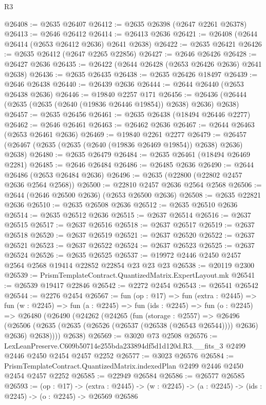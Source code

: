 \begin{lexlean}{R3}
\begin{coremodule}
@26408 := @2635 @26407
@26412 := @2635 @26398 (@2647 @2261 @26378)
@26413 := @2646 @26412
@26414 := @26413 @2636
@26421 := @26408 (@2644 @26414 (@2653 @26412 @2636) @2641 @2638)
@26422 := @2635 @26421
@26426 := @2635 @26412 (@2647 @2265 @22856)
@26427 := @2646 @26426
@26428 := @26427 @2636
@26435 := @26422 (@2644 @26428 (@2653 @26426 @2636) @2641 @2638)
@26436 := @2635 @26435
@26438 := @2635 @26426 @18497
@26439 := @2646 @26438
@26440 := @26439 @2636
@26444 := @2644 @26440 (@2653 @26438 @2636)
@26446 := @19840 @2257 @171
@26456 := @26436 (@26444 (@2635 (@2635 (@2640 (@19836 @26446 @19854)) @2638) @2636) @2638)
@26457 := @2635 @26456
@26461 := @2635 @26438 (@18494 @26446 @2277)
@26462 := @2646 @26461
@26463 := @26462 @2636
@26467 := @2644 @26463 (@2653 @26461 @2636)
@26469 := @19840 @2261 @2277
@26479 := @26457 (@26467 (@2635 (@2635 (@2640 (@19836 @26469 @19854)) @2638) @2636) @2638)
@26480 := @2635 @26479
@26484 := @2635 @26461 (@18494 @26469 @2281)
@26485 := @2646 @26484
@26486 := @26485 @2636
@26490 := @2644 @26486 (@2653 @26484 @2636)
@26496 := @2635 (@22800 (@22802 @2457 @2636 @2564 @2568))
@26500 := @22810 @2457 @2636 @2564 @2568
@26506 := @2644 (@2646 @26500 @2636) (@2653 @26500 @2636)
@26508 := @2635 @22821 @2636
@26510 := @2635 @26508 @2636
@26512 := @2635 @26510 @2636
@26514 := @2635 @26512 @2636
@26515 := @2637 @26514
@26516 := @2637 @26515
@26517 := @2637 @26516
@26518 := @2637 @26517
@26519 := @2637 @26518
@26520 := @2637 @26519
@26521 := @2637 @26520
@26522 := @2637 @26521
@26523 := @2637 @26522
@26524 := @2637 @26523
@26525 := @2637 @26524
@26526 := @2635 @26525
@26537 := @19972 @2446 @2450 @2457 @2564 @2568 @19414 @22852 @22854 @23 @23 @23
@26538 := @20119 @2300
@26539 := PrismTemplateContract.QuantizedMatrix.ExpertLayout.mk
@26541 := @26539 @19417 @22846
@26542 := @2272 @2454
@26543 := @26541 @26542
@26544 := @2276 @2454
@26567 := fun (op : @17) =>
  fun (extra : @2445) =>
  fun (w : @2245) =>
  fun (a : @2245) =>
  fun (ids : @2245) =>
  fun (o : @2245) =>
  @26480
    (@26490
      (@24262
        (@24265
          (fun (storage : @2557) =>
          @26496
            (@26506 (@2635 (@2635 (@26526 (@26537 (@26538 (@26543 @26544)))) @2636) @2636) @2638))))
      @2638)
@26569 := @3020 @73 @2508
@26576 := LexLeanPreserve.C609b50714e255bda233894df5d1d120d.R3.__fits_3
    @2499
    @2446
    @2450
    @2454
    @2457
    @2252
@26577 := @3023 @26576
@26584 := PrismTemplateContract.QuantizedMatrix.indexedPlan @2499 @2446 @2450 @2454 @2457 @2252
@26585 := @22949 @26584
@26586 := @26577 @26585
@26593 := (op : @17) ->
  (extra : @2445) -> (w : @2245) -> (a : @2245) -> (ids : @2245) -> (o : @2245) -> @26569 @26586

\end{coremodule}
\end{lexlean}
